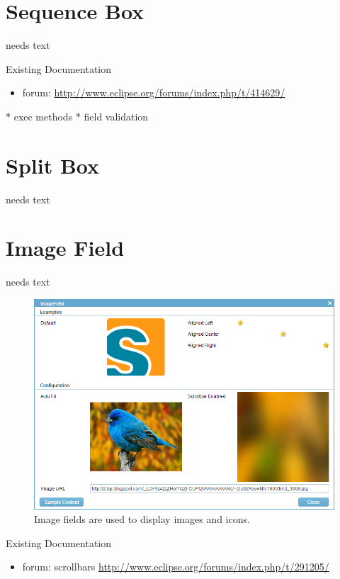 \documentclass[a4paper,10pt,twoside]{book}
\begin{document}
\section{Sequence Box}
needs text

\noindent Existing Documentation
\begin{itemize}
  \item forum: \url{http://www.eclipse.org/forums/index.php/t/414629/}
\end{itemize}

* exec methods
* field validation


\section{Split Box}
needs text

\section{Image Field}
needs text


\begin{figure}
\includegraphics[width=14cm]{imagefield.png}
\caption{Image fields are used to display images and icons.
}
\end{figure}

\noindent Existing Documentation
\begin{itemize}
  \item forum: scrollbars \url{http://www.eclipse.org/forums/index.php/t/291205/}
\end{itemize}
\end{document}
